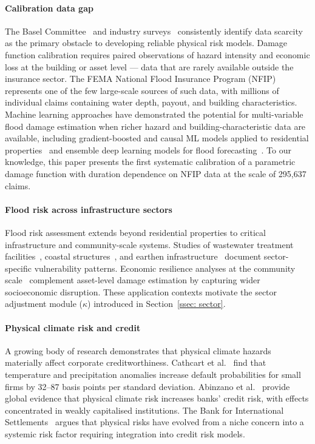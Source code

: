 \paragraph{Calibration data gap}
The Basel Committee~\cite{basel2021a, basel2021b} and industry surveys~\cite{unepfi2025bridging} consistently identify data scarcity as the primary obstacle to developing reliable physical risk models. Damage function calibration requires paired observations of hazard intensity and economic loss at the building or asset level --- data that are rarely available outside the insurance sector. The FEMA National Flood Insurance Program (NFIP) represents one of the few large-scale sources of such data, with millions of individual claims containing water depth, payout, and building characteristics. Machine learning approaches have demonstrated the potential for multi-variable flood damage estimation when richer hazard and building-characteristic data are available, including gradient-boosted and causal ML models applied to residential properties~\cite{museru2025improving, museru2024advancing} and ensemble deep learning models for flood forecasting~\cite{kordani2024improving}. To our knowledge, this paper presents the first systematic calibration of a parametric damage function with duration dependence on NFIP data at the scale of 295{,}637 claims.

\paragraph{Flood risk across infrastructure sectors}
Flood risk assessment extends beyond residential properties to critical infrastructure and community-scale systems. Studies of wastewater treatment facilities~\cite{nazari2022hydrodynamic, sun2021comprehensive}, coastal structures~\cite{fahad2020coupled, fahad2022decision}, and earthen infrastructure~\cite{motamedi2018quantitative} document sector-specific vulnerability patterns. Economic resilience analyses at the community scale~\cite{nazari2025small} complement asset-level damage estimation by capturing wider socioeconomic disruption. These application contexts motivate the sector adjustment module ($\kappa$) introduced in Section~\ref{ssec: sector}.

\paragraph{Physical climate risk and credit}
A growing body of research demonstrates that physical climate hazards materially affect corporate creditworthiness. Cathcart et al.~\cite{cathcart2026rain} find that temperature and precipitation anomalies increase default probabilities for small firms by 32--87 basis points per standard deviation. Abinzano et al.~\cite{abinzano2026physical} provide global evidence that physical climate risk increases banks' credit risk, with effects concentrated in weakly capitalised institutions. The Bank for International Settlements~\cite{bis2025physical} argues that physical risks have evolved from a niche concern into a systemic risk factor requiring integration into credit risk models.

